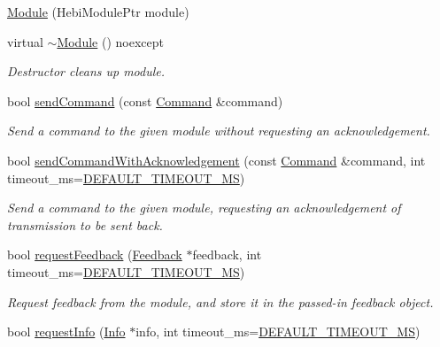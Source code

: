 \begin{DoxyCompactItemize}
\item 
\hyperlink{classhebi_1_1Module_af8192ddf0477c4bc59f0dd2bd009b08e}{Module} (Hebi\+Module\+Ptr module)
\item 
\mbox{\label{classhebi_1_1Module_a378cb7c5f76bbaa8fa26a084fb8bda5c}} 
virtual \hyperlink{classhebi_1_1Module_a378cb7c5f76bbaa8fa26a084fb8bda5c}{$\sim$\+Module} () noexcept
\begin{DoxyCompactList}\small\item\em Destructor cleans up module. \end{DoxyCompactList}\item 
bool \hyperlink{classhebi_1_1Module_a63034ea7310270b62166380aeb10a5cf}{send\+Command} (const \hyperlink{classhebi_1_1Command}{Command} \&command)
\begin{DoxyCompactList}\small\item\em Send a command to the given module without requesting an acknowledgement. \end{DoxyCompactList}\item 
bool \hyperlink{classhebi_1_1Module_a51fb07826384f58697a2e276464d83cb}{send\+Command\+With\+Acknowledgement} (const \hyperlink{classhebi_1_1Command}{Command} \&command, int timeout\+\_\+ms=\hyperlink{classhebi_1_1Module_afba0d28ff83c8ddabd8f6490e412c821}{D\+E\+F\+A\+U\+L\+T\+\_\+\+T\+I\+M\+E\+O\+U\+T\+\_\+\+MS})
\begin{DoxyCompactList}\small\item\em Send a command to the given module, requesting an acknowledgement of transmission to be sent back. \end{DoxyCompactList}\item 
bool \hyperlink{classhebi_1_1Module_a5a7fa02cdcc5baf34f17c0e3badfc1e8}{request\+Feedback} (\hyperlink{classhebi_1_1Feedback}{Feedback} $\ast$feedback, int timeout\+\_\+ms=\hyperlink{classhebi_1_1Module_afba0d28ff83c8ddabd8f6490e412c821}{D\+E\+F\+A\+U\+L\+T\+\_\+\+T\+I\+M\+E\+O\+U\+T\+\_\+\+MS})
\begin{DoxyCompactList}\small\item\em Request feedback from the module, and store it in the passed-\/in feedback object. \end{DoxyCompactList}\item 
bool \hyperlink{classhebi_1_1Module_a90fdca0e2c4d1ebd1cbdd3f1e05adc3c}{request\+Info} (\hyperlink{classhebi_1_1Info}{Info} $\ast$info, int timeout\+\_\+ms=\hyperlink{classhebi_1_1Module_afba0d28ff83c8ddabd8f6490e412c821}{D\+E\+F\+A\+U\+L\+T\+\_\+\+T\+I\+M\+E\+O\+U\+T\+\_\+\+MS})

\end{DoxyCompactItemize}
